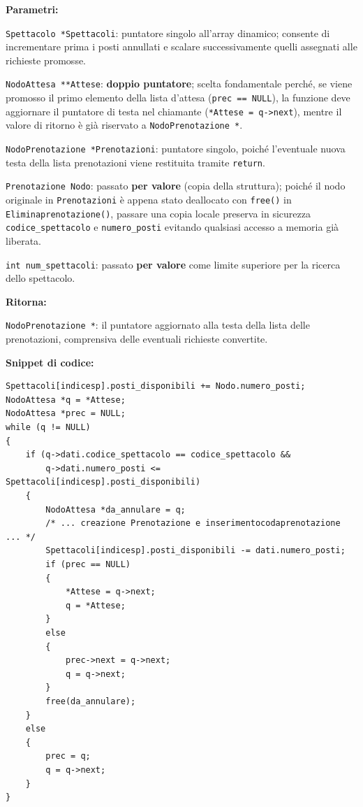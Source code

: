 \documentclass[11pt,a4paper,oneside,openany]{book}
\newenvironment{listacomp}{%
    \small
    \begin{list}{\textendash}{%
        \setlength{\topsep}{2pt}%
        \setlength{\partopsep}{0pt}%
        \setlength{\itemsep}{1pt}%
        \setlength{\parsep}{0pt}%
        \setlength{\leftmargin}{1.2em}%
    }%
}{%
    \end{list}%
}
\begin{document}
\noindent\textbf{Parametri:}
\begin{listacomp}
    \item \texttt{Spettacolo *Spettacoli}: puntatore singolo all'array dinamico; consente di incrementare prima i posti annullati e scalare successivamente quelli assegnati alle richieste promosse.
    \item \texttt{NodoAttesa **Attese}: \textbf{doppio puntatore}; scelta fondamentale perché, se viene promosso il primo elemento della lista d'attesa (\texttt{prec == NULL}), la funzione deve aggiornare il puntatore di testa nel chiamante (\texttt{*Attese = q->next}), mentre il valore di ritorno è già riservato a \texttt{NodoPrenotazione *}.
    \item \texttt{NodoPrenotazione *Prenotazioni}: puntatore singolo, poiché l'eventuale nuova testa della lista prenotazioni viene restituita tramite \texttt{return}.
    \item \texttt{Prenotazione Nodo}: passato \textbf{per valore} (copia della struttura); poiché il nodo originale in \texttt{Prenotazioni} è appena stato deallocato con \texttt{free()} in \texttt{Eliminaprenotazione()}, passare una copia locale preserva in sicurezza \texttt{codice\_spettacolo} e \texttt{numero\_posti} evitando qualsiasi accesso a memoria già liberata.
    \item \texttt{int num\_spettacoli}: passato \textbf{per valore} come limite superiore per la ricerca dello spettacolo.
\end{listacomp}

\noindent\textbf{Ritorna:}
\begin{listacomp}
    \item \texttt{NodoPrenotazione *}: il puntatore aggiornato alla testa della lista delle prenotazioni, comprensiva delle eventuali richieste convertite.
\end{listacomp}

\noindent\textbf{Snippet di codice:}
\begin{lstlisting}[caption={Ripristino posti e promozione FIFO dalla lista d'attesa in converteprenotazione()}]
Spettacoli[indicesp].posti_disponibili += Nodo.numero_posti;
NodoAttesa *q = *Attese;
NodoAttesa *prec = NULL;
while (q != NULL)
{
    if (q->dati.codice_spettacolo == codice_spettacolo &&
        q->dati.numero_posti <= Spettacoli[indicesp].posti_disponibili)
    {
        NodoAttesa *da_annulare = q;
        /* ... creazione Prenotazione e inserimentocodaprenotazione ... */
        Spettacoli[indicesp].posti_disponibili -= dati.numero_posti;
        if (prec == NULL)
        {
            *Attese = q->next;
            q = *Attese;
        }
        else
        {
            prec->next = q->next;
            q = q->next;
        }
        free(da_annulare);
    }
    else
    {
        prec = q;
        q = q->next;
    }
}
\end{lstlisting}
\end{document}
